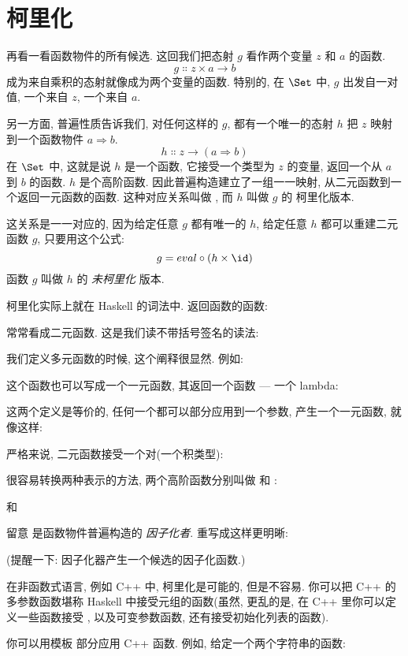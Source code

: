 \section{柯里化}

再看一看函数物件的所有候选. 这回我们把态射 $g$ 看作两个变量 $z$ 和 $a$ 的函数.
\[g \Colon z \times a \to b\]
成为来自乘积的态射就像成为两个变量的函数. 特别的, 在 $\Set$ 中, $g$ 出发自一对值, 一个来自 $z$, 一个来自 $a$.

另一方面, 普遍性质告诉我们, 对任何这样的 $g$, 都有一个唯一的态射 $h$ 把 $z$ 映射到一个函数物件 $a \Rightarrow b$.
\[h \Colon z \to (a \Rightarrow b)\]
在 $\Set$ 中, 这就是说 $h$ 是一个函数, 它接受一个类型为 $z$ 的变量, 返回一个从 $a$ 到 $b$ 的函数. $h$ 是个高阶函数.
因此普遍构造建立了一组一一映射, 从二元函数到一个返回一元函数的函数. 这种对应关系叫做 , 而 $h$ 叫做 $g$ 的
柯里化版本.

这关系是一一对应的, 因为给定任意 $g$ 都有唯一的 $h$, 给定任意 $h$ 都可以重建二元函数 $g$, 只要用这个公式:
\[g = eval \circ (h \times \id)\]
函数 $g$ 叫做 $h$ 的 \emph{未柯里化} 版本.

柯里化实际上就在 Haskell 的词法中. 返回函数的函数:

常常看成二元函数. 这是我们读不带括号签名的读法:

我们定义多元函数的时候, 这个阐释很显然. 例如:

这个函数也可以写成一个一元函数, 其返回一个函数 --- 一个 lambda:

这两个定义是等价的, 任何一个都可以部分应用到一个参数, 产生一个一元函数, 就像这样:

严格来说, 二元函数接受一个对(一个积类型):

很容易转换两种表示的方法, 两个高阶函数分别叫做  和 :

和

留意  是函数物件普遍构造的 \emph{因子化者}. 重写成这样更明晰:

(提醒一下: 因子化器产生一个候选的因子化函数.)

在非函数式语言, 例如 C++ 中, 柯里化是可能的, 但是不容易. 你可以把 C++ 的多参数函数堪称 Haskell 中接受元组的函数(虽然,
更乱的是, 在 C++ 里你可以定义一些函数接受 , 以及可变参数函数, 还有接受初始化列表的函数).

你可以用模板  部分应用 C++ 函数. 例如, 给定一个两个字符串的函数:

